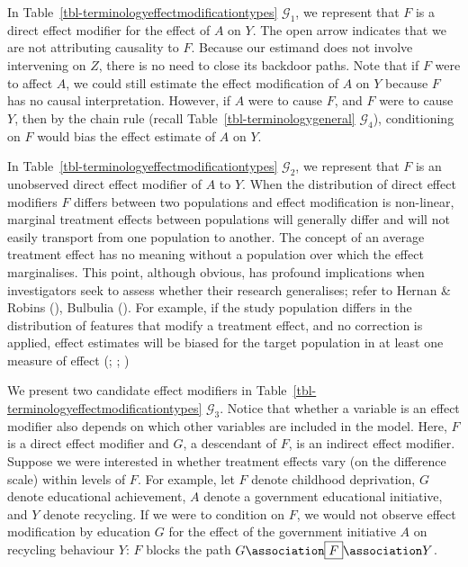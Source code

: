 \documentclass[
  single column]{article}
\begin{document}
In Table~\ref{tbl-terminologyeffectmodificationtypes} \(\mathcal{G}_1\),
we represent that \(F\) is a direct effect modifier for the effect of
\(A\) on \(Y\). The open arrow indicates that we are not attributing
causality to \(F\). Because our estimand does not involve intervening on
\(Z\), there is no need to close its backdoor paths. Note that if \(F\)
were to affect \(A\), we could still estimate the effect modification of
\(A\) on \(Y\) because \(F\) has no causal interpretation. However, if
\(A\) were to cause \(F\), and \(F\) were to cause \(Y\), then by the
chain rule (recall Table~\ref{tbl-terminologygeneral}
\(\mathcal{G}_4\)), conditioning on \(F\) would bias the effect estimate
of \(A\) on \(Y\).

In Table~\ref{tbl-terminologyeffectmodificationtypes} \(\mathcal{G}_2\),
we represent that \(F\) is an unobserved direct effect modifier of \(A\)
to \(Y\). When the distribution of direct effect modifiers \(F\) differs
between two populations and effect modification is non-linear, marginal
treatment effects between populations will generally differ and will not
easily transport from one population to another. The concept of an
average treatment effect has no meaning without a population over which
the effect marginalises. This point, although obvious, has profound
implications when investigators seek to assess whether their research
generalises; refer to Hernan \& Robins
(), Bulbulia
(). For example, if the study
population differs in the distribution of features that modify a
treatment effect, and no correction is applied, effect estimates will be
biased for the target population in at least one measure of effect
(;
;
)

We present two candidate effect modifiers in
Table~\ref{tbl-terminologyeffectmodificationtypes} \(\mathcal{G}_3\).
Notice that whether a variable is an effect modifier also depends on
which other variables are included in the model. Here, \(F\) is a direct
effect modifier and \(G\), a descendant of \(F\), is an indirect effect
modifier. Suppose we were interested in whether treatment effects vary
(on the difference scale) within levels of \(F\). For example, let \(F\)
denote childhood deprivation, \(G\) denote educational achievement,
\(A\) denote a government educational initiative, and \(Y\) denote
recycling. If we were to condition on \(F\), we would not observe effect
modification by education \(G\) for the effect of the government
initiative \(A\) on recycling behaviour \(Y\): \(\boxed{F}\) blocks the
path \(G \association \boxed{F} \association Y\).
\end{document}
